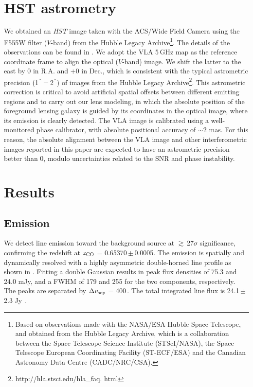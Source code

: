 \documentclass[]{emulateapj}
\begin{document}
\section{HST astrometry} \label{sec:HST}
We obtained an {\it HST} image taken with
the ACS/Wide Field Camera 
using the F555W filter ($V$-band)
from the
Hubble Legacy Archive\footnote{Based on observations
made with the NASA/ESA Hubble Space Telescope, and obtained from the Hubble
Legacy Archive, which is a collaboration between the Space Telescope Science
Institute (STScI/NASA), the Space Telescope European Coordinating Facility
(ST-ECF/ESA) and the Canadian Astronomy Data Centre (CADC/NRC/CSA).}. 
The details of the observations can be found
in .
We adopt the VLA 5\,GHz map as the
reference coordinate frame to align the optical ($V$-band) image.
We shift the latter to the east by 0 in R.A. and $+$0 in
Dec., which is consistent with the typical astrometric precision (1$^{\prime\prime}-$2$^{\prime\prime}$) of
images from the Hubble Legacy Archive\footnote{http://hla.stsci.edu/hla\_faq.
html}. This astrometric correction is critical to avoid artificial spatial
offsets between different emitting regions and to carry out our lens modeling,
in which the absolute position of the foreground lensing galaxy is guided by its
coordinates in the optical image, where its emission is clearly detected.
The VLA image is calibrated using a well-monitored phase
calibrator, with absolute positional accuracy of $\sim$2 mas.
For this reason, the absolute alignment between the VLA image and other
interferometric images reported in this paper are expected to have an astrometric
precision better than 0, modulo uncertainties related to the SNR and phase
instability.

\section{Results} \label{sec:results}
\subsection{\bco Emission} \label{sec:CO21} %
We detect \bco line emission toward the background source
at $\gtrsim$\,27$\sigma$ significance, confirming the redshift at $z_{\rm CO}$ =
0.65370\,$\pm$\,0.0005. The emission is spatially and dynamically resolved
with a highly asymmetric double-horned line profile
as shown in . Fitting a double Gaussian results in peak
flux densities of 75.3 and 24.0 mJy, and a FWHM of
179 \kms and 255 \kms for the two components, respectively. The peaks are separated by
$\Delta v_{\rm sep}$ = 400\,\kms. The total integrated line flux is 24.1\,$\pm$\,2.3 Jy \kms. %
\end{document}
